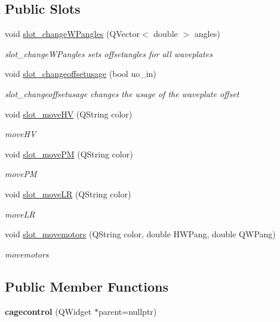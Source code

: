 \subsection*{Public Slots}
\begin{DoxyCompactItemize}
\item 
void \hyperlink{classcagecontrol_a27d63224f95901dbbe8560cd88c90bca}{slot\+\_\+change\+W\+Pangles} (Q\+Vector$<$ double $>$ angles)
\begin{DoxyCompactList}\small\item\em slot\+\_\+change\+W\+Pangles sets offsetangles for all waveplates \end{DoxyCompactList}\item 
void \hyperlink{classcagecontrol_a2e106a12191172da2780a3d7fe137041}{slot\+\_\+changeoffsetusage} (bool uo\+\_\+in)
\begin{DoxyCompactList}\small\item\em slot\+\_\+changeoffsetusage changes the usage of the waveplate offset \end{DoxyCompactList}\item 
void \hyperlink{classcagecontrol_af9a2772a38394159c54d7e5d7f2a86fb}{slot\+\_\+move\+HV} (Q\+String color)
\begin{DoxyCompactList}\small\item\em move\+HV \end{DoxyCompactList}\item 
void \hyperlink{classcagecontrol_a3207f15cba9458e32fb5c2cf366c4b44}{slot\+\_\+move\+PM} (Q\+String color)
\begin{DoxyCompactList}\small\item\em move\+PM \end{DoxyCompactList}\item 
void \hyperlink{classcagecontrol_a138905383fdc09a0b5077a185eaf6682}{slot\+\_\+move\+LR} (Q\+String color)
\begin{DoxyCompactList}\small\item\em move\+LR \end{DoxyCompactList}\item 
void \hyperlink{classcagecontrol_a2d971435af3267351272b2c2d5f2f709}{slot\+\_\+movemotors} (Q\+String color, double H\+W\+Pang, double Q\+W\+Pang)
\begin{DoxyCompactList}\small\item\em movemotors \end{DoxyCompactList}\end{DoxyCompactItemize}
\subsection*{Public Member Functions}
\begin{DoxyCompactItemize}
\item 
\mbox{\label{classcagecontrol_a6630362ef3dd621859126e357e545dd5}} 
{\bfseries cagecontrol} (Q\+Widget $\ast$parent=nullptr)
\end{DoxyCompactItemize}
